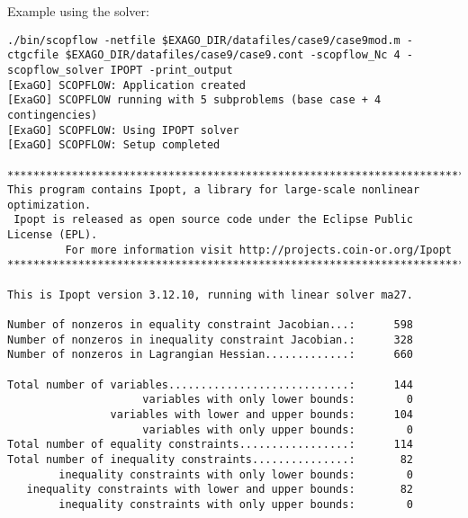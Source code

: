 Example using the \ipopt solver:

\begin{lstlisting}
./bin/scopflow -netfile $EXAGO_DIR/datafiles/case9/case9mod.m -ctgcfile $EXAGO_DIR/datafiles/case9/case9.cont -scopflow_Nc 4 -scopflow_solver IPOPT -print_output 
[ExaGO] SCOPFLOW: Application created
[ExaGO] SCOPFLOW running with 5 subproblems (base case + 4 contingencies)
[ExaGO] SCOPFLOW: Using IPOPT solver
[ExaGO] SCOPFLOW: Setup completed

******************************************************************************
This program contains Ipopt, a library for large-scale nonlinear optimization.
 Ipopt is released as open source code under the Eclipse Public License (EPL).
         For more information visit http://projects.coin-or.org/Ipopt
******************************************************************************

This is Ipopt version 3.12.10, running with linear solver ma27.

Number of nonzeros in equality constraint Jacobian...:      598
Number of nonzeros in inequality constraint Jacobian.:      328
Number of nonzeros in Lagrangian Hessian.............:      660

Total number of variables............................:      144
                     variables with only lower bounds:        0
                variables with lower and upper bounds:      104
                     variables with only upper bounds:        0
Total number of equality constraints.................:      114
Total number of inequality constraints...............:       82
        inequality constraints with only lower bounds:        0
   inequality constraints with lower and upper bounds:       82
        inequality constraints with only upper bounds:        0


\end{lstlisting}
